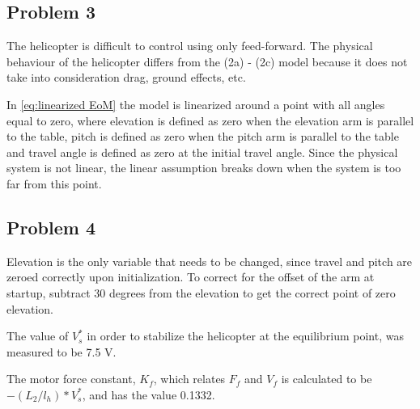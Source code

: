 \subsection{Problem 3}
The helicopter is difficult to control using only feed-forward. The
physical behaviour of the helicopter differs from the (2a) - (2c)
\cite[p.13]{assignment} model because it does not take into
consideration drag, ground effects, etc.

In \cref{eq:linearized EoM} the model is linearized around a point with
all angles equal to zero, where elevation is defined as zero when the
elevation arm is parallel to the table, pitch is defined as zero when
the pitch arm is parallel to the table and travel angle is defined as
zero at the initial travel angle. Since the physical system is not
linear, the linear assumption breaks down when the system is too far
from this point.

\subsection{Problem 4}
Elevation is the only variable that needs to be changed, since travel
and pitch are zeroed correctly upon initialization. To correct for the
offset of the arm at startup, subtract 30 degrees from the elevation
to get the correct point of zero elevation.

The value of $V^*_s$ in order to stabilize the helicopter at the
equilibrium point, was measured to be 7.5 V.

The motor force constant, $K_f$, which relates $F_f$ and $V_f$ is
calculated to be $-(L_2/l_h)*V^*_s$, and has the value 0.1332.


